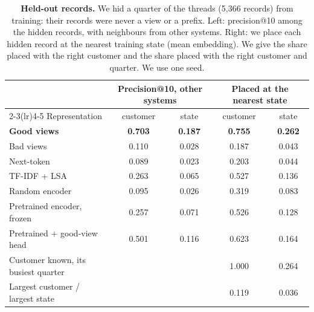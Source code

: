 \documentclass[11pt]{article}
\begin{document}
\begin{table}[h]
\centering
\small
\caption{\textbf{Held-out records.} We hid a quarter of the threads (5{,}366 records) from training: their records were never a view or a prefix. Left: precision@10 among the hidden records, with neighbours from other systems. Right: we place each hidden record at the nearest training state (mean embedding). We give the share placed with the right customer and the share placed with the right customer and quarter. We use one seed.}
\label{tab:heldout}
\setlength{\tabcolsep}{6pt}\begin{tabular}{lcccc}
\toprule
& \multicolumn{2}{c}{Precision@10, other systems} & \multicolumn{2}{c}{Placed at the nearest state} \\
\cmidrule(lr){2-3}\cmidrule(lr){4-5}
Representation & customer & state & customer & state \\
\midrule
\textcolor{goodblue}{\textbf{Good views}} & \textbf{0.703} & \textbf{0.187} & \textbf{0.755} & \textbf{0.262} \\
\textcolor{badorange}{Bad views} & 0.110 & 0.028 & 0.187 & 0.043 \\
\textcolor{ntpaqua}{Next-token} & 0.089 & 0.023 & 0.203 & 0.044 \\
TF-IDF + LSA & 0.263 & 0.065 & 0.527 & 0.136 \\
Random encoder & 0.095 & 0.026 & 0.319 & 0.083 \\
Pretrained encoder, frozen & 0.257 & 0.071 & 0.526 & 0.128 \\
Pretrained + good-view head & 0.501 & 0.116 & 0.623 & 0.164 \\
\midrule
Customer known, its busiest quarter & & & 1.000 & 0.264 \\
Largest customer / largest state & & & 0.119 & 0.036 \\
\bottomrule
\end{tabular}
\end{table}
\end{document}
